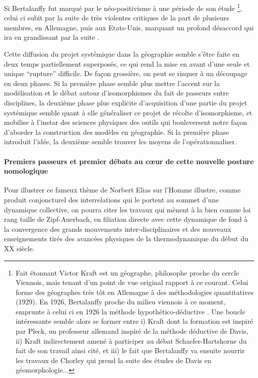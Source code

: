 Si Bertalanffy fut marqué par le néo-positivisme à une période de son étude \footnote{Fait étonnant Victor Kraft est un géographe, philosophe proche du cercle Viennois, mais tenant d'un point de vue original rapport à ce courant. Celui forme des géographes très tôt en Allemagne à des méthodologies quantitatives (1929). En 1926, Bertalanffy proche du milieu viennois à ce moment, emprunte à celui ci en 1926 la méthode hypothético-déductive \autocite[342]{Pouvreau2013}. Une boucle intéressante semble alors se former entre i) Kraft dont la formation est inspiré par Pleck, un professeur allemand inspiré de la méthode déductive de Davis, ii) Kraft indirectement amené à participer au débat Schaefer-Hartshorne du fait de son travail ainsi cité, et iii) le fait que Bertalanffy va ensuite nourrir les travaux de Chorley qui prend la suite des études de Davis en géomorphologie...}, celui ci subit par la suite de très violentes critiques de la part de plusieurs membres, en Allemagne, puis aux Etats-Unis, marquant un profond désaccord qui ira en grandissant par la suite \autocite[26-27]{Pouvreau2006}. 

Cette diffusion du projet systémique dans la géographie semble s'être faite en deux temps partiellement superposés, ce qui rend la mise en avant d'une seule et unique \enquote{rupture} difficile. De façon grossière, on peut se risquer à un découpage en deux phases. Si la première phase semble plus mettre l'accent sur la modélisation et le débat autour d'isomorphismes du fait de passeurs entre disciplines, la deuxième phase plus explicite d'acquisition d'une partie du projet systémique semble quant à elle généraliser ce projet de récolte d'isomorphisme, et mobilise à l'instar des sciences physiques des outils qui bouleversent notre façon d'aborder la construction des modèles en géographie. Si la première phase introduit l'idée, la deuxième semble trouver les moyens de l’opérationnaliser.

\paragraph{Premiers passeurs et premier débats au cœur de cette nouvelle posture nomologique}

Pour illustrer ce fameux thème de Norbert Elias \autocite[31-33]{Delmotte2010} \textcite{Elias1991} sur l'Homme illustre, comme produit conjoncturel des interrelations qui le portent au sommet d'une dynamique collective, on pourra citer les travaux qui mènent à la bien connue loi rang taille de Zipf-Auerbach, en filiation directe avec cette dynamique de fond à la convergence des grands mouvements inter-disciplinaires et des nouveaux enseignements tirés des avancées physiques de la thermodynamique du début du XX siècle.

